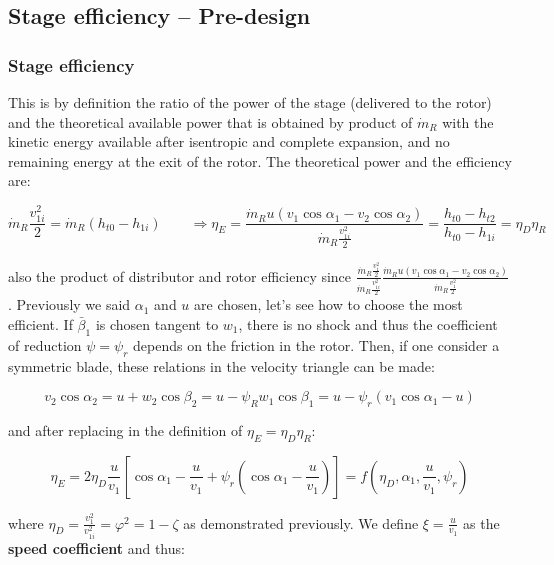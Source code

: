 \subsection{Stage efficiency – Pre-design}
\subsubsection{Stage efficiency}
This is by definition the ratio of the power of the stage (delivered to the rotor) and the theoretical available power that is obtained by product of $\dot{m}_R$ with the kinetic energy available after isentropic and complete expansion, and no remaining energy at the exit of the rotor. The theoretical power and the efficiency are: 

\begin{equation}
\dot{m}_R\frac{v^2_{1i}}{2} = \dot{m}_R (h_{t0} - h_{1i}) \qquad \Rightarrow \eta _E = \frac{\dot{m }_R u(v_1 \cos \alpha _1 - v_2 \cos \alpha _2)}{\dot{m}_R\frac{v^2_{1i}}{2}} =  \frac{h_{t0} - h_{t2}}{ h_{t0} - h_{1i} } =  \eta _D \eta _R
\end{equation} 

also the product of distributor and rotor efficiency since $\frac{\dot{m}_R\frac{v_1^2}{2}}{\dot{m}_R\frac{v_{1i}^2}{2}}\frac{\dot{m }_R u(v_1 \cos \alpha _1 - v_2 \cos \alpha _2)}{\dot{m}_R\frac{v_1^2}{2}}$. Previously we said $\alpha _1$ and $u$ are chosen, let's see how to choose the most efficient. If $\bar{\beta}_1$ is chosen tangent to $w_1$, there is no shock and thus the coefficient of reduction $\psi = \psi _r$ depends on the friction in the rotor. Then, if one consider a symmetric blade, these relations in the velocity triangle can be made: 

\begin{equation}
v_2 \cos \alpha _2 = u + w_2 \cos \beta _2 = u - \psi _R w_1 \cos \beta _1 = u - \psi _r (v_1 \cos \alpha _1 - u)
\end{equation}

and after replacing in the definition of $\eta _E = \eta _D \eta _R$: 

\begin{equation}
\eta _E = 2\eta _D \frac{u}{v_1} \left[ \cos \alpha _1 - \frac{u}{v_1} + \psi _r \left( \cos \alpha _1 - \frac{u}{v_1}\right)\right] = f(\eta _D , \alpha _1, \frac{u}{v_1}, \psi _r)
\end{equation}

where $\eta _D = \frac{v_1^2}{v_{1i}^2} = \varphi ^2 = 1-\zeta$ as demonstrated previously. We define $\xi = \frac{u}{v_1}$ as the \textbf{speed coefficient} and thus: 

